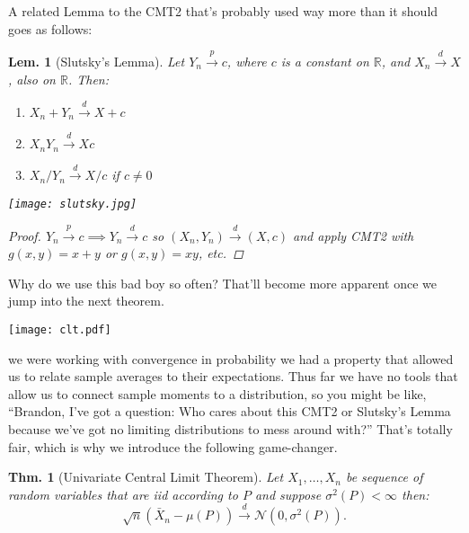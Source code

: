 \documentclass{tufte-book}
\theoremstyle{mytheoremstyle}
\newtheorem*{thm}{Thm.}
\theoremstyle{mylemstyle}
\newtheorem*{lem}{Lem.}
\theoremstyle{mydefstyle}
\begin{document}
A related Lemma to the CMT2 that's probably used way more than it should goes as follows:
\begin{lem}[Slutsky's Lemma] Let \(Y_n \overset{p}{\rightarrow} c\), where \(c\) is a constant on \(\mathbb{R}\), and \(X_n \overset{d}{\rightarrow} X\), also on \(\mathbb{R}\). Then:
	\begin{enumerate}
		\item \(X_n + Y_n \overset{d}{\rightarrow} X + c\)
		\item \(X_nY_n \overset{d}{\rightarrow} Xc\)
		\item \(X_n / Y_n \overset{d}{\rightarrow} X/c\) if \(c \ne 0\) 
	\end{enumerate}
		\begin{marginfigure}
			\texttt{[image: slutsky.jpg]}
			\caption{Eugen Slutsky. Gotta respect that hair. Damn.}
		\end{marginfigure}	
	\begin{proof}
		\(Y_n \overset{p}{\rightarrow} c \implies Y_n \overset{d}{\rightarrow} c\) so \((X_n, Y_n) \overset{d}{\rightarrow} (X, c)\) and apply CMT2 with \(g(x, y) = x+y\) or \(g(x, y) = xy\), etc.
	\end{proof}
\end{lem} Why do we use this bad boy so often? That'll become more apparent once we jump into the next theorem.
\begin{figure*} \texttt{[image: clt.pdf]} \caption{Central Limit Theorem in action. Each panel plots the density of \(n\) observations of \(\bar{X}_{100}\) 25 times, where \(X_i \sim \text{Bernoulli}(0.3)\). Panel A has \(n = 10\). Panel B has \(n = 50\) and Panel C has \(n = 1000\). Looks pretty normal to me.} \end{figure*}

 we were working with convergence in probability we had a property that allowed us to relate sample averages to their expectations. Thus far we have no tools that allow us to connect sample moments to a distribution, so you might be like, ``Brandon, I've got a question: Who cares about this CMT2 or Slutsky's Lemma because we've got no limiting distributions to mess around with?'' That's totally fair, which is why we introduce the following game-changer.
\begin{thm}[Univariate Central Limit Theorem] Let \(X_1, \dots, X_n\) be sequence of random variables that are iid according to \(P\) and suppose \(\sigma^2(P) < \infty\) then:
	\[\sqrt{n}(\bar{X}_n - \mu(P)) \overset{d}{\rightarrow} \mathcal{N}(0 , \sigma^2(P)) \text{.}\]
\end{thm}
\end{document}
